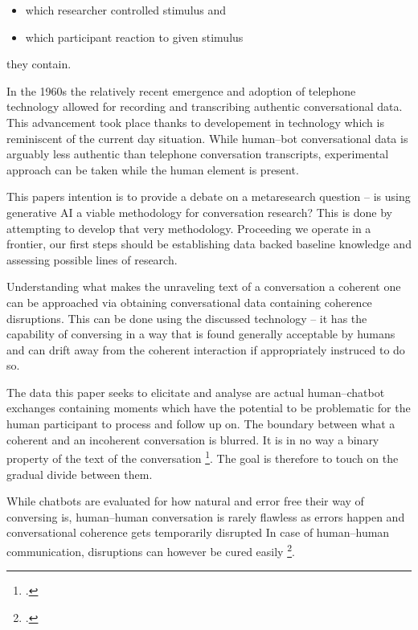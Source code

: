 \documentclass[12pt]{report}
\begin{document}
\begin{itemize}
    \item
    which researcher controlled stimulus and
    \item
    which participant reaction to given stimulus
\end{itemize}

they contain.

\par
In the 1960s the relatively recent emergence and adoption of telephone technology
allowed for recording and transcribing authentic conversational data.
This advancement took place thanks to developement in technology
which is reminiscent of the current day situation.
While human–bot conversational data is arguably less authentic than telephone conversation transcripts,
experimental approach can be taken while the human element is present.

\par
This papers intention is to provide a debate on a metaresearch question –
is using generative AI a viable methodology for conversation research?
This is done by attempting to develop that very methodology.
Proceeding we operate in a frontier,
our first steps should be establishing data backed baseline knowledge
and assessing possible lines of research.

\par
Understanding what makes
the unraveling text of a conversation a coherent one
can be approached via obtaining
conversational data containing coherence disruptions.
This can be done using the discussed technology –
it has the capability of conversing in a way
that is found generally acceptable by humans
and can drift away from the coherent interaction
if appropriately instruced to do so.

\par
The data this paper seeks to elicitate and analyse are
actual human–chatbot exchanges containing moments which
have the potential to be problematic for
the human participant to process and follow up on.
The boundary between what a coherent and an incoherent conversation is blurred.
It is in no way a binary property of the text of the conversation \footcite{givón2020coherence}.
The goal is therefore to touch on the gradual divide between them.

\par
While chatbots are evaluated for how natural and error free their way of conversing is,
human–human conversation is rarely flawless as
errors happen and
conversational coherence gets temporarily disrupted
In case of human–human communication, disruptions can however be cured easily \footcite{bublitz1999disturbed, DINGEMANSE202430}.
\end{document}
